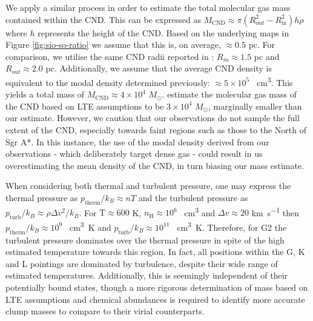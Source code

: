 \documentclass[twocolumn]{aastex631}
\begin{document}
We apply a similar process in order to estimate the total molecular gas mass contained within the CND. This can be expressed as $M_{\mathrm{CND}} \approx \pi (R_{\mathrm{out}}^{2} - R_{\mathrm{in}}^{2}) h \rho$ where $h$ represents the height of the CND. Based on the underlying  maps in Figure \ref{fig:sio-so-ratio} we  assume that this is, on average, $\approx 0.5$ pc. For comparison, we utilise the same CND radii reported in \citet{tsuboiCNR}: $R_{in} \approx 1.5$ pc and $R_{out} \approx 2.0$ pc. Additionally, we assume that the average CND density is equivalent to the modal density determined previously: $\approx 5 \times 10^{5}$ \si{\per\centi\meter\cubed}. This yields a total mass of $M_{\mathrm{CND}} \approx 4 \times 10^{4}$ $M_{\odot}$. \citet{tsuboiCNR} estimate the molecular gas mass of the CND based on LTE assumptions to be $3 \times 10^{4}$ $M_{\odot}$, marginally smaller than our estimate. However, we caution that our observations do not sample the full extent of the CND, especially towards  faint regions such as those to the North of Sgr A*. In this instance, the use of the modal density derived from our observations - which deliberately target dense gas - could result in us overestimating the mean density of the CND, in turn biasing our mass estimate. 

When considering both thermal and turbulent pressure, one may express the thermal pressure as $p_{\mathrm{therm}} / k_{B} \approx n T$ and the turbulent pressure as $p_{\mathrm{turb}} / k_{B} \approx \rho \Delta v^{2}/k_{B}$. For $\mathrm{T} \approx 600$ \si{\kelvin}, $n_{\mathrm{H}} \approx 10^{6}$ \si{\per\centi\meter\cubed} and $\Delta v \approx 20$ \si{\kilo\meter\per\second} then $p_{\mathrm{therm}} / k_{B} \approx 10^{9}$ \si{\per\centi\meter\cubed\kelvin} and $p_{\mathrm{turb}} / k_{B} \approx 10^{11}$ \si{\per\centi\meter\cubed\kelvin}. Therefore, for G2 the turbulent pressure dominates over the thermal pressure in spite of the high estimated temperature towards this region. In fact, all positions within the G, K and L pointings are dominated by turbulence, despite their wide range of estimated temperatures. Additionally, this is seemingly independent of their potentially bound states, though a more rigorous determination of mass based on LTE assumptions and chemical abundances is required to identify more accurate clump masses to compare to their virial counterparts. 

\end{document}
